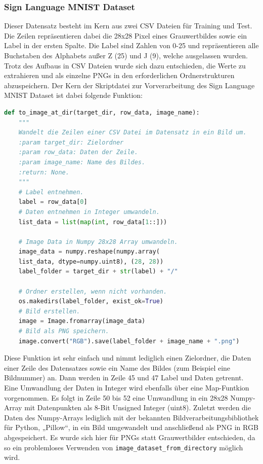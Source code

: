 \documentclass[11pt,bibliography=totocnumbered]{scrartcl}
\begin{document}
\subsubsection{Sign Language MNIST Dataset}
Dieser Datensatz besteht im Kern aus zwei CSV Dateien für Training und Test. Die Zeilen repräsentieren dabei die 28x28 Pixel eines Grauwertbildes sowie ein Label in der ersten Spalte. Die Label sind Zahlen von 0-25 und repräsentieren alle Buchstaben des Alphabets außer Z (25) und J (9), welche ausgelassen wurden. Trotz des Aufbaus in CSV Dateien wurde sich dazu entschieden, die Werte zu extrahieren und als einzelne PNGs in den erforderlichen Ordnerstrukturen abzuspeichern. Der Kern der Skriptdatei zur Vorverarbeitung des Sign Language MNIST Dataset ist dabei folgende Funktion:
\begin{lstlisting}[language=python,firstnumber=36,caption={Kern der Sign Language MNIST Dataset Vorverarbeitung.},label=lst:to_image_at_dir]
def to_image_at_dir(target_dir, row_data, image_name):
	"""
	Wandelt die Zeilen einer CSV Datei im Datensatz in ein Bild um.
	:param target_dir: Zielordner
	:param row_data: Daten der Zeile.
	:param image_name: Name des Bildes.
	:return: None.
	"""
	# Label entnehmen.
	label = row_data[0]
	# Daten entnehmen in Integer umwandeln.
	list_data = list(map(int, row_data[1::]))
	
	# Image Data in Numpy 28x28 Array umwandeln.
	image_data = numpy.reshape(numpy.array(
	list_data, dtype=numpy.uint8), (28, 28))
	label_folder = target_dir + str(label) + "/"
	
	# Ordner erstellen, wenn nicht vorhanden.
	os.makedirs(label_folder, exist_ok=True)
	# Bild erstellen.
	image = Image.fromarray(image_data)
	# Bild als PNG speichern.
	image.convert("RGB").save(label_folder + image_name + ".png")
\end{lstlisting}
Diese Funktion ist sehr einfach und nimmt lediglich einen Zielordner, die Daten einer Zeile des Datensatzes sowie ein Name des Bildes (zum Beispiel eine Bildnummer) an. Dann werden in Zeile 45 und 47 Label und Daten getrennt. Eine Umwandlung der Daten in Integer wird ebenfalls über eine Map-Funtkion vorgenommen. Es folgt in Zeile 50 bis 52 eine Umwandlung in ein 28x28 Numpy-Array mit Datenpunkten als 8-Bit Unsigned Integer (uint8). Zuletzt werden die Daten des Numpy-Arrays lediglich mit der bekannten Bildverarbeitungsbibliothek für Python, „Pillow“, in ein Bild umgewandelt und anschließend als PNG in RGB abgespeichert. Es wurde sich hier für PNGs statt  Grauwertbilder entschieden, da so ein problemloses Verwenden von \lstinline[language=pythoninline]|image_dataset_from_directory| möglich wird.
\end{document}
